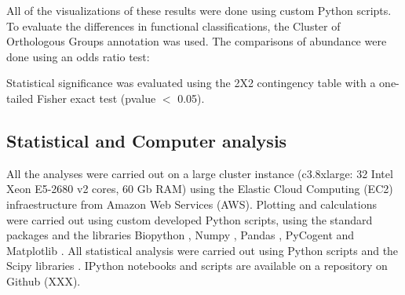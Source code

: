 All of the visualizations of these results were done using custom Python scripts. To evaluate the differences in functional classifications, the Cluster of Orthologous Groups \cite{Tatusov:2003fk} annotation was used. The comparisons of abundance were done using an odds ratio test:

\begin{center}
\end{center}

Statistical significance was evaluated using the 2X2 contingency table with a one-tailed Fisher exact test (pvalue $<$ 0.05).


\subsection{Statistical and Computer analysis}

All the analyses were carried out on a large cluster instance (c3.8xlarge: 32 Intel Xeon E5-2680 v2 cores, 60 Gb RAM) using the Elastic Cloud Computing (EC2) infraestructure from Amazon Web Services (AWS). Plotting and calculations were carried out using custom developed Python scripts, using the standard packages and the libraries Biopython \cite{Cock:2009hj}, Numpy \cite{Oliphant:2007ud} , Pandas \cite{mckinney-proc-scipy-2010}, PyCogent \cite{Knight:2007gp} and Matplotlib \cite{Hunter:2007ih}. All statistical analysis were carried out using Python scripts and the Scipy libraries \cite{Oliphant:2007ud}. IPython notebooks \cite{Perez:2007wf} and scripts are available on a repository on Github (XXX).


